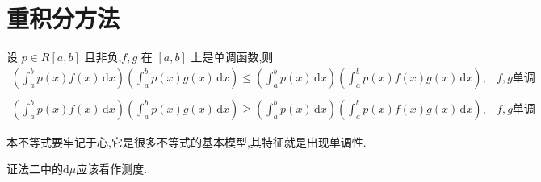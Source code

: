 \documentclass[../../main.tex]{subfiles}%
\begin{document}
\section{重积分方法}

\begin{theorem}\label{Chebeshev不等式积分形式}
设 \( p \in R[a,b] \) 且非负,\( f,g \) 在 \([a,b]\) 上是单调函数,则
\begin{align*}
\left( \int_{a}^{b} p(x) f(x) \,\mathrm{d}x \right) \left( \int_{a}^{b} p(x) g(x) \,\mathrm{d}x \right) \leqslant \left( \int_{a}^{b} p(x) \,\mathrm{d}x \right) \left( \int_{a}^{b} p(x) f(x) g(x) \,\mathrm{d}x \right), & f,g\text{单调性相同} \\
\\
\left( \int_{a}^{b} p(x) f(x) \,\mathrm{d}x \right) \left( \int_{a}^{b} p(x) g(x) \,\mathrm{d}x \right) \geqslant \left( \int_{a}^{b} p(x) \,\mathrm{d}x \right) \left( \int_{a}^{b} p(x) f(x) g(x) \,\mathrm{d}x \right), & f,g\text{单调性相反}
\nonumber
\end{align*}
\end{theorem}
\begin{note}
本不等式要牢记于心,它是很多不等式的基本模型,其特征就是出现单调性.
\end{note}
\begin{remark}
{\color{blue}证法二}中的$\mathrm{d}\mu$应该看作测度.
\end{remark}
\end{document}
